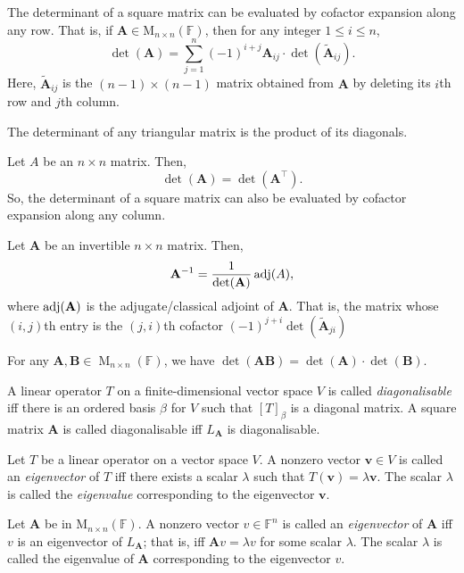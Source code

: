 \documentclass[../Notes.tex]{subfiles}
\begin{document}
\begin{theorem}{}{}
    The determinant of a square matrix can be evaluated by cofactor expansion along any row. That is, if \(\mathbf{A} \in \mathrm{M}_{n\times n}(\mathbb{F})\), then for any integer \(1\leq i\leq n\),
        \[\det(\mathbf{A})=\sum_{j=1}^{n}{(-1)}^{i+j}\mathbf{A}_{ij}\cdot \det(\widetilde{\mathbf{A}}_{ij}).\] 
        Here, \(\widetilde{\mathbf{A}}_{ij}\) is the \((n-1)\times(n-1)\) matrix obtained from \(\mathbf{A}\) by deleting its \(i\)th row and \(j\)th column.
\end{theorem}
\begin{corollary}{}{}
    The determinant of any triangular matrix is the product of its diagonals.
\end{corollary}
\begin{theorem}{}{}
    Let \(A\) be an \(n\times n\) matrix. Then,
    \[\det(\mathbf{A})=\det(\mathbf{A}^\top).\]
    So, the determinant of a square matrix can also be evaluated by cofactor expansion along any column.
\end{theorem}
\begin{theorem}{}{}
    Let \(\mathbf{A}\) be an invertible \(n\times n\) matrix. Then,
    \[\mathbf{A}^{-1}=\frac{1}{\det(\mathbf{A})}\operatorname{adj}(A),\]
    where \(\operatorname{adj}(\mathbf{A})\) is the adjugate/classical adjoint of \(\mathbf{A}\). That is, the matrix whose \((i,j)\)th entry is the \((j,i)\)th cofactor \((-1)^{j+i}\det(\widetilde{\mathbf{A}}_{ji})\)
\end{theorem}
\begin{theorem}{}{}
    For any \(\mathbf{A},\mathbf{B} \in \operatorname{M}_{n \times n}(\mathbb{F})\), we have \(\det(\mathbf{A}\mathbf{B})=\det(\mathbf{A})\cdot\det(\mathbf{B})\).
\end{theorem}
\begin{definition}{}{}
    A linear operator \(T\) on a finite-dimensional vector space \(V\) is called \emph{diagonalisable} iff there is an ordered basis \(\beta\) for \(V\) such that \([T]_\beta\) is a diagonal matrix. A square matrix \(\mathbf{A}\) is called diagonalisable iff \(L_\mathbf{A}\) is diagonalisable.
\end{definition}
\begin{definition}{}{}
    Let \(T\) be a linear operator on a vector space \(V\). A nonzero vector \(\mathbf{v}\in V\) is called an \emph{eigenvector} of \(T\) iff there exists a scalar \(\lambda\) such that \(T(\mathbf{v})=\lambda \mathbf{v}\). The scalar \(\lambda\) is called the \emph{eigenvalue} corresponding to the eigenvector \(\mathbf{v}\).

    Let \(\mathbf{A}\) be in \(\mathrm{M}_{n\times n}(\mathbb{F})\). A nonzero vector \(v\in \mathbb{F}^n\) is called an \emph{eigenvector} of \(\mathbf{A}\) iff \(v\) is an eigenvector of \(L_\mathbf{A}\); that is, iff \(\mathbf{A}v=\lambda v\) for some scalar \(\lambda\). The scalar \(\lambda\) is called the eigenvalue of \(\mathbf{A}\) corresponding to the eigenvector \(v\).
\end{definition}
\end{document}
